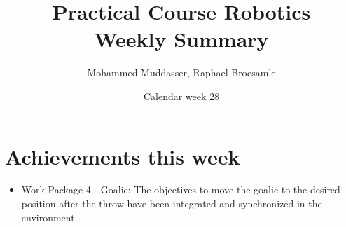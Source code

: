 \documentclass[12pt,pdftex,a4paper]{article}
\begin{document}
\title{Practical Course Robotics\\Weekly Summary}
\author{Mohammed Muddasser, Raphael Broesamle}
\date{Calendar week 28}
\maketitle

\section*{Achievements this week}
\begin{itemize}
\item
Work Package 4 - Goalie:
The objectives to move the goalie to the desired position after the throw have been integrated and synchronized in the environment.


\end{itemize}
\end{document}
